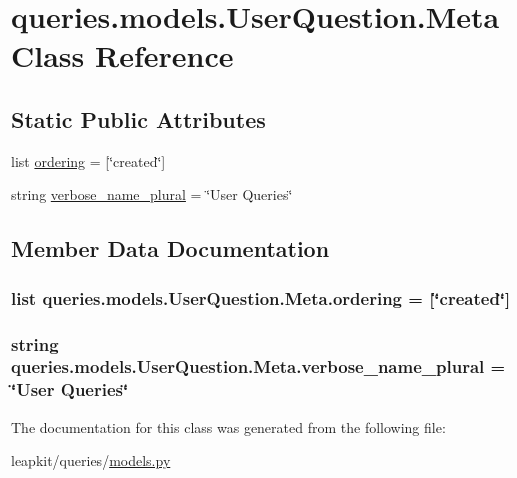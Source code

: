 \hypertarget{classqueries_1_1models_1_1_user_question_1_1_meta}{\section{queries.\-models.\-User\-Question.\-Meta Class Reference}
\label{classqueries_1_1models_1_1_user_question_1_1_meta}
}
\subsection*{Static Public Attributes}
\begin{DoxyCompactItemize}
\item 
list \hyperlink{classqueries_1_1models_1_1_user_question_1_1_meta_a31191fbf2002eaa951eb661423868636}{ordering} = \mbox{[}\char`\"{}created\char`\"{}\mbox{]}
\item 
string \hyperlink{classqueries_1_1models_1_1_user_question_1_1_meta_a0a51f8bac08d0d2063abc5977aee5161}{verbose\-\_\-name\-\_\-plural} = \char`\"{}User Queries\char`\"{}
\end{DoxyCompactItemize}


\subsection{Member Data Documentation}
\hypertarget{classqueries_1_1models_1_1_user_question_1_1_meta_a31191fbf2002eaa951eb661423868636}{
\subsubsection[{ordering}]{\setlength{\rightskip}{0pt plus 5cm}list queries.\-models.\-User\-Question.\-Meta.\-ordering = \mbox{[}\char`\"{}created\char`\"{}\mbox{]}\hspace{0.3cm}{\ttfamily [static]}}}\label{classqueries_1_1models_1_1_user_question_1_1_meta_a31191fbf2002eaa951eb661423868636}
\hypertarget{classqueries_1_1models_1_1_user_question_1_1_meta_a0a51f8bac08d0d2063abc5977aee5161}{
\subsubsection[{verbose\-\_\-name\-\_\-plural}]{\setlength{\rightskip}{0pt plus 5cm}string queries.\-models.\-User\-Question.\-Meta.\-verbose\-\_\-name\-\_\-plural = \char`\"{}User Queries\char`\"{}\hspace{0.3cm}{\ttfamily [static]}}}\label{classqueries_1_1models_1_1_user_question_1_1_meta_a0a51f8bac08d0d2063abc5977aee5161}


The documentation for this class was generated from the following file\-:\begin{DoxyCompactItemize}
\item 
leapkit/queries/\hyperlink{queries_2models_8py}{models.\-py}\end{DoxyCompactItemize}
